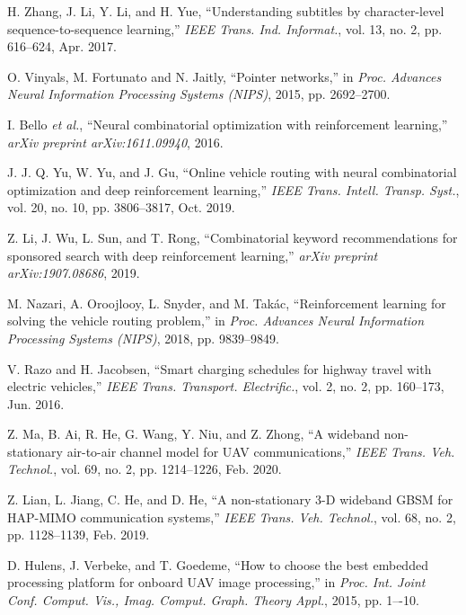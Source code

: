 \documentclass[journal]{IEEEtran}
\begin{document}
\begin{thebibliography}{1}
         H. Zhang, J. Li, Y. Li, and H. Yue, ``Understanding subtitles by character-level sequence-to-sequence learning,''  \emph{IEEE Trans. Ind. Informat.}, vol. 13, no. 2, pp. 616--624, Apr. 2017.

         O. Vinyals, M. Fortunato and N. Jaitly, ``Pointer networks,'' in \emph{Proc. Advances Neural Information Processing Systems (NIPS)}, 2015, pp. 2692--2700.


         I. Bello \emph{et al.}, ``Neural combinatorial optimization with reinforcement learning,'' \emph{arXiv preprint arXiv:1611.09940}, 2016.




         {J. J. Q. Yu, W. Yu, and J. Gu, ``Online vehicle routing with neural combinatorial optimization and deep reinforcement learning,''  \emph{IEEE Trans. Intell. Transp. Syst.}, vol. 20, no. 10, pp. 3806--3817, Oct. 2019.}

         {Z. Li, J. Wu, L. Sun, and T. Rong, ``Combinatorial keyword recommendations for sponsored search with deep reinforcement learning,''  \emph{arXiv preprint arXiv:1907.08686}, 2019.}

         M. Nazari, A. Oroojlooy, L. Snyder, and M. Takác, ``Reinforcement learning for solving the vehicle routing problem,'' in \emph{Proc. Advances Neural Information Processing Systems (NIPS)}, 2018, pp. 9839--9849.


         V. Razo and H. Jacobsen, ``Smart charging schedules for highway travel with electric vehicles,'' \emph{IEEE Trans. Transport. Electrific.}, vol. 2, no. 2, pp. 160--173, Jun. 2016.
		
		
         {Z. Ma, B. Ai, R. He, G. Wang, Y. Niu, and Z. Zhong, ``A wideband non-stationary air-to-air channel model for UAV communications,'' \emph{IEEE Trans. Veh. Technol.}, vol. 69, no. 2, pp. 1214--1226, Feb. 2020.}



          {Z. Lian, L. Jiang, C. He, and D. He, ``A non-stationary 3-D wideband GBSM for HAP-MIMO communication systems,'' \emph{IEEE Trans. Veh. Technol.}, vol. 68, no. 2, pp. 1128--1139, Feb. 2019.}
             		
		
		
		 D. Hulens, J. Verbeke, and T. Goedeme, ``How to choose the best embedded processing platform for onboard UAV image processing,'' in \emph{Proc. Int. Joint Conf. Comput. Vis., Imag. Comput. Graph. Theory Appl.}, 2015, pp. 1–-10.
		


\end{thebibliography}
\end{document}
